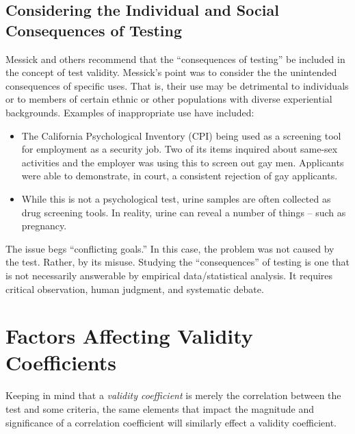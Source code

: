 \documentclass[
  english,
]{book}
\providecommand{\tightlist}{%
  \setlength{\itemsep}{0pt}\setlength{\parskip}{0pt}}
\begin{document}
\hypertarget{considering-the-individual-and-social-consequences-of-testing}{%
\subsection{Considering the Individual and Social Consequences of Testing}\label{considering-the-individual-and-social-consequences-of-testing}}

Messick \citep{messick_consequences_2000} and others recommend that the ``consequences of testing'' be included in the concept of test validity. Messick's point was to consider the the unintended consequences of specific uses. That is, their use may be detrimental to individuals or to members of certain ethnic or other populations with diverse experiential backgrounds. Examples of inappropriate use have included:

\begin{itemize}
\tightlist
\item
  The California Psychological Inventory (CPI) being used as a screening tool for employment as a security job. Two of its items inquired about same-sex activities and the employer was using this to screen out gay men. Applicants were able to demonstrate, in court, a consistent rejection of gay applicants.
\item
  While this is not a psychological test, urine samples are often collected as drug screening tools. In reality, urine can reveal a number of things -- such as pregnancy.
\end{itemize}

The issue begs ``conflicting goals.'' In this case, the problem was not caused by the test. Rather, by its misuse. Studying the ``consequences'' of testing is one that is not necessarily answerable by empirical data/statistical analysis. It requires critical observation, human judgment, and systematic debate.

\hypertarget{factors-affecting-validity-coefficients}{%
\section{Factors Affecting Validity Coefficients}\label{factors-affecting-validity-coefficients}}

Keeping in mind that a \emph{validity coefficient} is merely the correlation between the test and some criteria, the same elements that impact the magnitude and significance of a correlation coefficient will similarly effect a validity coefficient.
\end{document}
